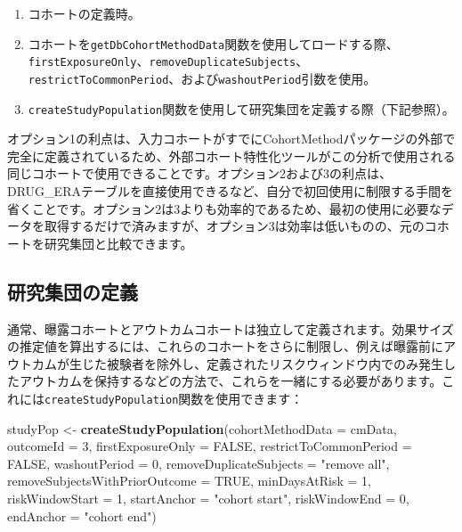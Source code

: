 \documentclass[
  11pt]{book}
\newenvironment{Shaded}{\begin{snugshade}}{\end{snugshade}}
\newcommand{\AttributeTok}[1]{\textcolor[rgb]{0.13,0.29,0.53}{#1}}
\newcommand{\ConstantTok}[1]{\textcolor[rgb]{0.56,0.35,0.01}{#1}}
\newcommand{\DecValTok}[1]{\textcolor[rgb]{0.00,0.00,0.81}{#1}}
\newcommand{\FunctionTok}[1]{\textcolor[rgb]{0.13,0.29,0.53}{\textbf{#1}}}
\newcommand{\NormalTok}[1]{#1}
\newcommand{\OtherTok}[1]{\textcolor[rgb]{0.56,0.35,0.01}{#1}}
\newcommand{\StringTok}[1]{\textcolor[rgb]{0.31,0.60,0.02}{#1}}
\providecommand{\tightlist}{%
  \setlength{\itemsep}{0pt}\setlength{\parskip}{0pt}}
\theoremstyle{definition}
\theoremstyle{definition}
\theoremstyle{definition}
\theoremstyle{definition}
\theoremstyle{remark}
\begin{document}
\begin{enumerate}
\def\labelenumi{\arabic{enumi}.}
\tightlist
\item
  コホートの定義時。
\item
  コホートを\texttt{getDbCohortMethodData}関数を使用してロードする際、\texttt{firstExposureOnly}、\texttt{removeDuplicateSubjects}、\texttt{restrictToCommonPeriod}、および\texttt{washoutPeriod}引数を使用。
\item
  \texttt{createStudyPopulation}関数を使用して研究集団を定義する際（下記参照）。
\end{enumerate}

オプション1の利点は、入力コホートがすでにCohortMethodパッケージの外部で完全に定義されているため、外部コホート特性化ツールがこの分析で使用される同じコホートで使用できることです。オプション2および3の利点は、DRUG\_ERAテーブルを直接使用できるなど、自分で初回使用に制限する手間を省くことです。オプション2は3よりも効率的であるため、最初の使用に必要なデータを取得するだけで済みますが、オプション3は効率は低いものの、元のコホートを研究集団と比較できます。

\subsection{研究集団の定義}\label{ux7814ux7a76ux96c6ux56e3ux306eux5b9aux7fa9}

通常、曝露コホートとアウトカムコホートは独立して定義されます。効果サイズの推定値を算出するには、これらのコホートをさらに制限し、例えば曝露前にアウトカムが生じた被験者を除外し、定義されたリスクウィンドウ内でのみ発生したアウトカムを保持するなどの方法で、これらを一緒にする必要があります。これには\texttt{createStudyPopulation}関数を使用できます：

\begin{Shaded}
\begin{Highlighting}[]
\NormalTok{studyPop }\OtherTok{\textless{}{-}} \FunctionTok{createStudyPopulation}\NormalTok{(}\AttributeTok{cohortMethodData =}\NormalTok{ cmData,}
                                  \AttributeTok{outcomeId =} \DecValTok{3}\NormalTok{,}
                                  \AttributeTok{firstExposureOnly =} \ConstantTok{FALSE}\NormalTok{,}
                                  \AttributeTok{restrictToCommonPeriod =} \ConstantTok{FALSE}\NormalTok{,}
                                  \AttributeTok{washoutPeriod =} \DecValTok{0}\NormalTok{,}
                                  \AttributeTok{removeDuplicateSubjects =} \StringTok{"remove all"}\NormalTok{,}
                                  \AttributeTok{removeSubjectsWithPriorOutcome =} \ConstantTok{TRUE}\NormalTok{,}
                                  \AttributeTok{minDaysAtRisk =} \DecValTok{1}\NormalTok{,}
                                  \AttributeTok{riskWindowStart =} \DecValTok{1}\NormalTok{,}
                                  \AttributeTok{startAnchor =} \StringTok{"cohort start"}\NormalTok{,}
                                  \AttributeTok{riskWindowEnd =} \DecValTok{0}\NormalTok{,}
                                  \AttributeTok{endAnchor =} \StringTok{"cohort end"}\NormalTok{)}
\end{Highlighting}
\end{Shaded}
\end{document}
